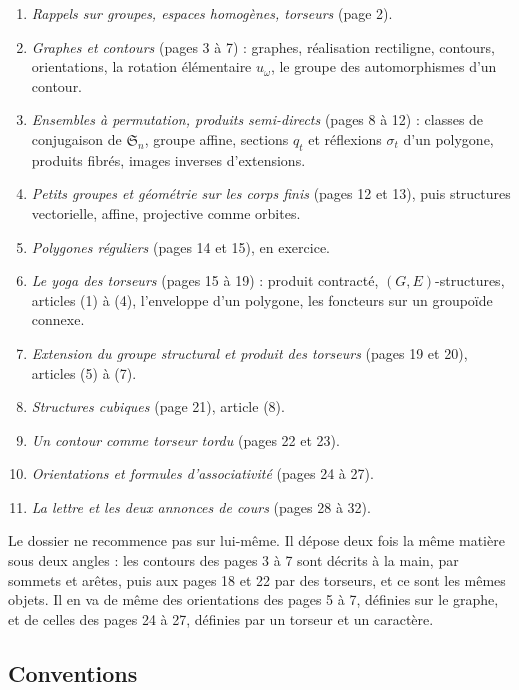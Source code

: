 \documentclass[11pt,a4paper]{article}
\begin{document}
\begin{enumerate}
\item[1.] \emph{Rappels sur groupes, espaces homogènes, torseurs} (page 2).
\item[2.] \emph{Graphes et contours} (pages 3 à 7) : graphes, réalisation
rectiligne, contours, orientations, la rotation élémentaire $u_\omega$, le
groupe des automorphismes d'un contour.
\item[3.] \emph{Ensembles à permutation, produits semi-directs} (pages 8 à
12) : classes de conjugaison de $\mathfrak{S}_n$, groupe affine, sections
$q_t$ et réflexions $\sigma_t$ d'un polygone, produits fibrés, images
inverses d'extensions.
\item[4.] \emph{Petits groupes et géométrie sur les corps finis} (pages 12 et
13), puis structures vectorielle, affine, projective comme orbites.
\item[5.] \emph{Polygones réguliers} (pages 14 et 15), en exercice.
\item[6.] \emph{Le yoga des torseurs} (pages 15 à 19) : produit contracté,
$(G,E)$-structures, articles (1) à (4), l'enveloppe d'un polygone, les
foncteurs sur un groupoïde connexe.
\item[7.] \emph{Extension du groupe structural et produit des torseurs}
(pages 19 et 20), articles (5) à (7).
\item[8.] \emph{Structures cubiques} (page 21), article (8).
\item[9.] \emph{Un contour comme torseur tordu} (pages 22 et 23).
\item[10.] \emph{Orientations et formules d'associativité} (pages 24 à 27).
\item[11.] \emph{La lettre et les deux annonces de cours} (pages 28 à 32).
\end{enumerate}

Le dossier ne recommence pas sur lui-même. Il dépose deux fois la même
matière sous deux angles : les contours des pages 3 à 7 sont décrits à la main,
par sommets et arêtes, puis aux pages 18 et 22 par des torseurs, et ce sont
les mêmes objets. Il en va de même des orientations des pages 5 à 7, définies
sur le graphe, et de celles des pages 24 à 27, définies par un torseur et un
caractère.

\subsection*{Conventions}
\end{document}
